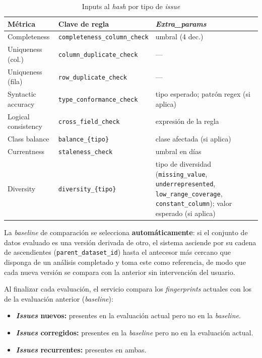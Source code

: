 \begin{table}[htbp]
  \centering
  \caption{Inputs al \emph{hash} por tipo de \emph{issue}}
  \label{tab:fingerprint-inputs}
  \small
  \begin{tabularx}{\textwidth}{l l X}
    \toprule
    \textbf{Métrica} & \textbf{Clave de regla} & \textbf{\emph{Extra\_params}} \\
    \midrule
    Completeness    & \texttt{completeness\_column\_check}   & umbral (4 dec.) \\
    Uniqueness (col.) & \texttt{column\_duplicate\_check}    & --- \\
    Uniqueness (fila) & \texttt{row\_duplicate\_check}       & --- \\
    Syntactic accuracy & \texttt{type\_conformance\_check}  & tipo esperado; patrón regex (si aplica) \\
    Logical consistency & \texttt{cross\_field\_check}      & expresión de la regla \\
    Class balance   & \texttt{balance\_\{tipo\}}             & clase afectada (si aplica) \\
    Currentness     & \texttt{staleness\_check}              & umbral en días \\
    Diversity       & \texttt{diversity\_\{tipo\}}            & tipo de diversidad (\texttt{missing\_value}, \texttt{underrepresented}, \texttt{low\_range\_coverage}, \texttt{constant\_column}); valor esperado (si aplica) \\
    \bottomrule
  \end{tabularx}
\end{table}

La \emph{baseline} de comparación se selecciona \textbf{automáticamente}: si el
conjunto de datos evaluado es una versión derivada de otro, el sistema asciende
por su cadena de ascendientes (\texttt{parent\_dataset\_id}) hasta el antecesor
más cercano que disponga de un análisis completado y toma este como referencia,
de modo que cada nueva versión se compara con la anterior sin intervención del
usuario.

Al finalizar cada evaluación, el servicio compara los \emph{fingerprints}
actuales con los de la evaluación anterior (\emph{baseline}):

\begin{itemize}
  \item \textbf{\emph{Issues} nuevos:} presentes en la evaluación actual pero
    no en la \emph{baseline}.
  \item \textbf{\emph{Issues} corregidos:} presentes en la \emph{baseline}
    pero no en la evaluación actual.
  \item \textbf{\emph{Issues} recurrentes:} presentes en ambas.
\end{itemize}

